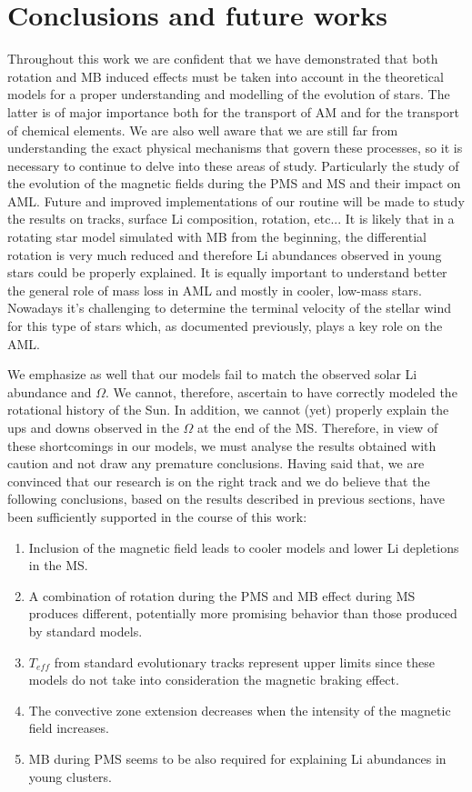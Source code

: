 \documentclass[fleqn,usenatbib]{mnras}
\begin{document}
\section{Conclusions and future works} \label{sec_4}
Throughout this work we are confident that we have demonstrated that both rotation and MB induced effects must be taken into account in the theoretical models for a proper understanding and modelling of the evolution of stars. The latter is of major importance both for the transport of AM and for the transport of chemical elements. We are also well aware that we are still far from understanding the exact physical mechanisms that govern these processes, so it is necessary to continue to delve into these areas of study. Particularly the study of the evolution of the magnetic fields during the PMS and MS and their impact on AML. Future and improved implementations of our routine will be made to study the results on tracks, surface Li composition, rotation, etc... It is likely that in a rotating star model simulated with MB from the beginning, the differential rotation is very much reduced and therefore Li abundances observed in young stars could be properly explained. It is equally important to understand better the general role of mass loss in AML and mostly in cooler, low-mass stars. Nowadays it's challenging to determine the terminal velocity of the stellar wind for this type of stars which, as documented previously, plays a key role on the AML.\par

We emphasize as well that our models fail to match the observed solar Li abundance and $\Omega$. We cannot, therefore, ascertain to have correctly modeled the rotational history of the Sun. In addition, we cannot (yet) properly explain the ups and downs observed in the $\Omega$ at the end of the MS. Therefore, in view of these shortcomings in our models, we must analyse the results obtained with caution and not draw any premature conclusions. Having said that, we are convinced that our research is on the right track and we do believe that the following conclusions, based on the results described in previous sections, have been sufficiently supported in the course of this work:
\begin{enumerate}
    \item Inclusion of the magnetic field leads to cooler models and lower Li depletions in the MS.
    \item A combination of rotation during the PMS and MB effect during MS produces different, potentially more promising behavior than those produced by standard models.
    \item $T_{eff}$ from standard evolutionary tracks represent upper limits since these models do not take into consideration the magnetic braking effect.
    \item The convective zone extension decreases when the intensity of the magnetic field increases.
    \item MB during PMS seems to be also required for explaining Li abundances in young clusters.
\end{enumerate}
\end{document}
